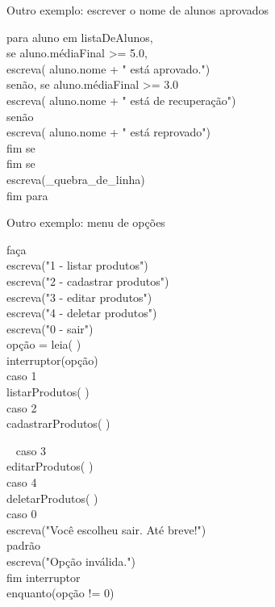 \documentclass{beamer}%
\def\azul{\color{blue!90!black}}
\begin{document}
\begin{frame}
Outro exemplo: escrever o nome de alunos aprovados

{\azul
para aluno em listaDeAlunos,\\
\qquad se aluno.médiaFinal >= 5.0,\\
\qquad\qquad escreva( aluno.nome + " está aprovado.")\\
\qquad senão, se aluno.médiaFinal >= 3.0\\
\qquad\qquad\qquad escreva( aluno.nome + " está de recuperação")\\
\qquad\qquad senão\\
\qquad\qquad\qquad escreva( aluno.nome + " está reprovado")\\
\qquad\qquad fim se\\
\qquad fim se\\
\qquad escreva(\_quebra\_de\_linha)\\
fim para
}
\end{frame}



\begin{frame}
Outro exemplo: menu de opções

{\azul
faça\\
\qquad escreva("1 - listar produtos")\\
\qquad escreva("2 - cadastrar produtos")\\
\qquad escreva("3 - editar produtos")\\
\qquad escreva("4 - deletar produtos")\\
\qquad escreva("0 - sair")\\
\qquad opção = leia( )\\
\qquad interruptor(opção)\\
\qquad\qquad caso 1\\
\qquad\qquad\qquad  listarProdutos( )\\
\qquad\qquad caso 2\\
\qquad\qquad\qquad  cadastrarProdutos( )
}
\end{frame}



\begin{frame}\
{\azul
\qquad\qquad caso 3\\
\qquad\qquad\qquad  editarProdutos( )\\
\qquad\qquad caso 4\\
\qquad\qquad\qquad  deletarProdutos( )\\
\qquad\qquad caso 0\\
\qquad\qquad\qquad escreva("Você escolheu sair. Até breve!")\\
\qquad\qquad padrão\\
\qquad\qquad\qquad escreva("Opção inválida.")\\
\qquad fim interruptor\\
enquanto(opção != 0)
}
\end{frame}
\end{document}
